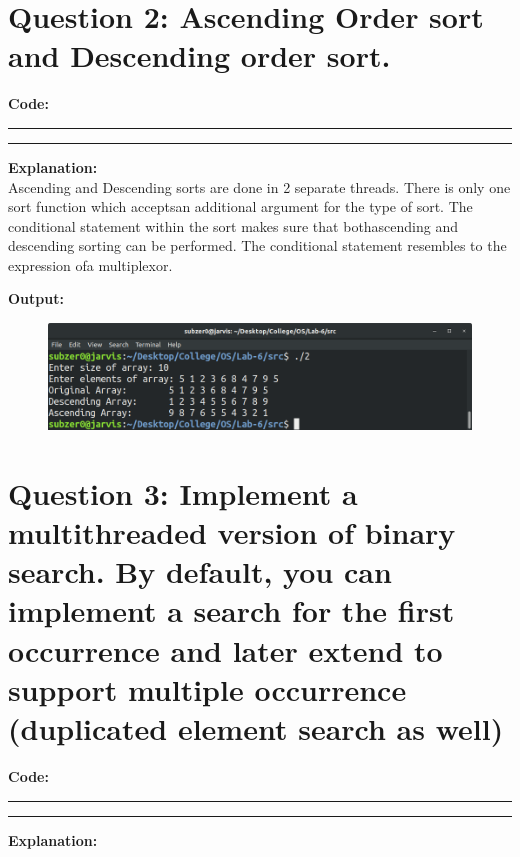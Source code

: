 \documentclass{article}
\begin{document}
\section*{Question 2: Ascending Order sort and Descending order sort.}
\bigskip

\par\noindent
\textbf{\Large Code: }
\smallskip
\par\noindent\rule{\textwidth}{0.4pt}

\par\noindent\rule{\textwidth}{0.4pt}

\bigskip
\noindent
\textbf{\Large Explanation: } \\

Ascending and Descending sorts are done in 2 separate threads. 
There is only one sort function which acceptsan additional 
argument for the type of sort.  The conditional statement within
the sort makes sure that bothascending and descending sorting 
can be performed.  The conditional statement resembles to the 
expression ofa multiplexor.

\bigskip
\noindent
\textbf{\Large Output:}

\begin{figure}[h]
	\includegraphics[width=\textwidth]{output/2.png}
\end{figure}
\bigskip


\section*{Question 3: Implement a multithreaded version of binary search. By default, you can implement a search for the first occurrence and later extend to support multiple occurrence (duplicated element search as well)}
\bigskip

\par\noindent
\textbf{\Large Code: }
\smallskip
\par\noindent\rule{\textwidth}{0.4pt}

\par\noindent\rule{\textwidth}{0.4pt}

\bigskip
\noindent
\textbf{\Large Explanation: } \\
\end{document}
